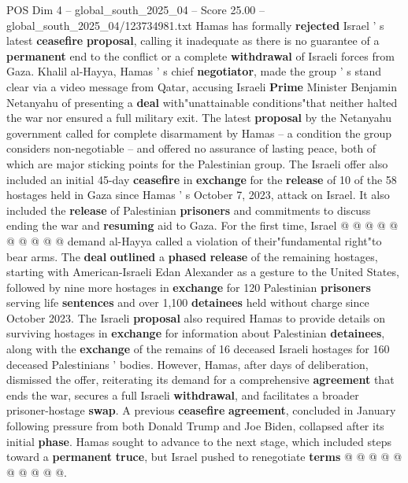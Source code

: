 \begin{textsample}{POS Dim 4 – global\_south\_2025\_04 – Score 25.00 – global\_south\_2025\_04/123734981.txt}  \label{ex:f4_pos_221}
Hamas has formally \textbf{rejected} Israel ' s latest \textbf{ceasefire} \textbf{proposal}, calling it inadequate as there is no guarantee of a \textbf{permanent} end to the conflict or a complete \textbf{withdrawal} of Israeli forces from Gaza.
Khalil al-Hayya, Hamas ' s chief \textbf{negotiator}, made the group ' s stand clear via a video message from Qatar, accusing Israeli \textbf{Prime} Minister Benjamin Netanyahu of presenting a \textbf{deal} with"unattainable conditions"that neither halted the war nor ensured a full military exit.
The latest \textbf{proposal} by the Netanyahu government called for complete disarmament by Hamas -- a condition the group considers non-negotiable -- and offered no assurance of lasting peace, both of which are major sticking points for the Palestinian group.
The Israeli offer also included an initial 45-day \textbf{ceasefire} in \textbf{exchange} for the \textbf{release} of 10 of the 58 hostages held in Gaza since Hamas ' s October 7, 2023, attack on Israel.
It also included the \textbf{release} of Palestinian \textbf{prisoners} and commitments to discuss ending the war and \textbf{resuming} aid to Gaza.
For the first time, Israel @ @ @ @ @ @ @ @ @ @ demand al-Hayya called a violation of their"fundamental right"to bear arms.
The \textbf{deal} \textbf{outlined} a \textbf{phased} \textbf{release} of the remaining hostages, starting with American-Israeli Edan Alexander as a gesture to the United States, followed by nine more hostages in \textbf{exchange} for 120 Palestinian \textbf{prisoners} serving life \textbf{sentences} and over 1,100 \textbf{detainees} held without charge since October 2023.
The Israeli \textbf{proposal} also required Hamas to provide details on surviving hostages in \textbf{exchange} for information about Palestinian \textbf{detainees}, along with the \textbf{exchange} of the remains of 16 deceased Israeli hostages for 160 deceased Palestinians ' bodies.
However, Hamas, after days of deliberation, dismissed the offer, reiterating its demand for a comprehensive \textbf{agreement} that ends the war, secures a full Israeli \textbf{withdrawal}, and facilitates a broader prisoner-hostage \textbf{swap}.
A previous \textbf{ceasefire} \textbf{agreement}, concluded in January following pressure from both Donald Trump and Joe Biden, collapsed after its initial \textbf{phase}.
Hamas sought to advance to the next stage, which included steps toward a \textbf{permanent} \textbf{truce}, but Israel pushed to renegotiate \textbf{terms} @ @ @ @ @ @ @ @ @ @.

\end{textsample}
